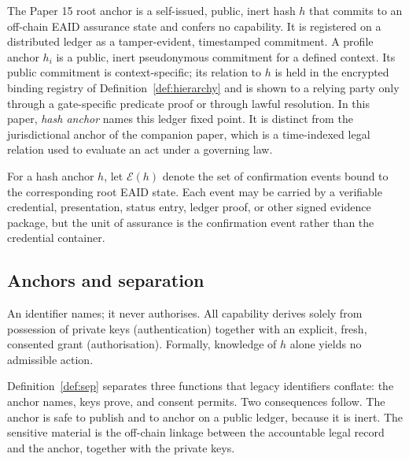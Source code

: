 \documentclass[oneside,10pt]{swissi}
\begin{document}
\begin{definition}
\label{def:anchor}
The Paper 15 root anchor is a self-issued, public, inert hash $h$ that commits to an off-chain EAID assurance state and confers no capability. It is registered on a distributed ledger as a tamper-evident, timestamped commitment. A profile anchor $h_i$ is a public, inert pseudonymous commitment for a defined context. Its public commitment is context-specific; its relation to $h$ is held in the encrypted binding registry of Definition~\ref{def:hierarchy} and is shown to a relying party only through a gate-specific predicate proof or through lawful resolution. In this paper, \emph{hash anchor} names this ledger fixed point. It is distinct from the jurisdictional anchor of the companion paper, which is a time-indexed legal relation used to evaluate an act under a governing law.
\end{definition}

\begin{definition}
\label{def:evidence}
For a hash anchor $h$, let $\mathcal{E}(h)$ denote the set of confirmation events bound to the corresponding root EAID state. Each event may be carried by a verifiable credential, presentation, status entry, ledger proof, or other signed evidence package, but the unit of assurance is the confirmation event rather than the credential container.\cite{w3cvc,oid4vp}
\end{definition}

\subsection{Anchors and separation}

\begin{definition}
\label{def:sep}
An identifier names; it never authorises. All capability derives solely from possession of private keys (authentication) together with an explicit, fresh, consented grant (authorisation). Formally, knowledge of $h$ alone yields no admissible action.
\end{definition}

Definition~\ref{def:sep} separates three functions that legacy identifiers conflate: the anchor names, keys prove, and consent permits. Two consequences follow. The anchor is safe to publish and to anchor on a public ledger, because it is inert. The sensitive material is the off-chain linkage between the accountable legal record and the anchor, together with the private keys.
\end{document}
